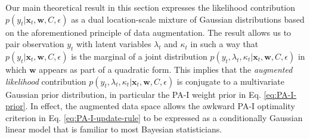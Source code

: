 Our main theoretical result in this section expresses the likelihood contribution $p(y_{t}|\mathbf{x}_{t}, \mathbf{w}, C, \epsilon)$ as a dual location-scale mixture of Gaussian distributions based on the aforementioned principle of data augmentation. The result allows us to pair observation $y_t$ with latent variables $\lambda_t$ and $\kappa_t$ in such a way that $p(y_{t}|\mathbf{x}_{t}, \mathbf{w}, C, \epsilon)$ is the marginal of a joint distribution $p(y_{t}, \lambda_t, \kappa_t|\mathbf{x}_{t}, \mathbf{w}, C, \epsilon)$ in which $\mathbf{w}$ appears as part of a quadratic form. This implies that the \emph{augmented likelihood} contribution $p(y_{t}, \lambda_t, \kappa_t|\mathbf{x}_{t}, \mathbf{w}, C, \epsilon)$ is conjugate to a multivariate Gaussian prior distribution, in particular the PA-I weight prior in Eq. \eqref{eq:PA-I-prior}. In effect, the augmented data space allows the awkward PA-I optimality criterion in Eq. \eqref{eq:PA-I-update-rule} to be expressed as a conditionally Gaussian linear model that is familiar to most Bayesian statisticians.
